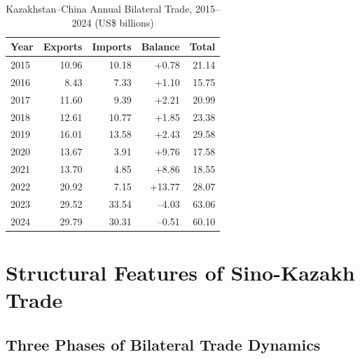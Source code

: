 \documentclass[12pt]{article}
\begin{document}
\begin{table}[H]
\centering
\small
\caption{Kazakhstan--China Annual Bilateral Trade, 2015--2024 (US\$ billions)}
\label{tab:annual_trade}
\begin{tabular}{lrrrr}
\toprule
Year & Exports & Imports & Balance & Total \\
\midrule
2015 & 10.96 & 10.18 & +0.78 & 21.14 \\
2016 & 8.43  & 7.33  & +1.10 & 15.75 \\
2017 & 11.60 & 9.39  & +2.21 & 20.99 \\
2018 & 12.61 & 10.77 & +1.85 & 23.38 \\
2019 & 16.01 & 13.58 & +2.43 & 29.58 \\
2020 & 13.67 & 3.91  & +9.76 & 17.58 \\
2021 & 13.70 & 4.85  & +8.86 & 18.55 \\
2022 & 20.92 & 7.15  & +13.77& 28.07 \\
2023 & 29.52 & 33.54 & --4.03 & 63.06 \\
2024 & 29.79 & 30.31 & --0.51 & 60.10 \\
\bottomrule
\end{tabular}
\end{table}

\section{Structural Features of Sino-Kazakh Trade}

\subsection{Three Phases of Bilateral Trade Dynamics}
\end{document}
